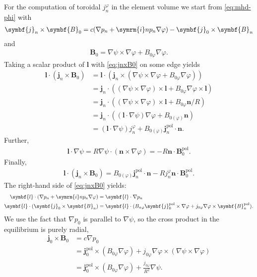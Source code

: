\documentclass[a4paper, 10pt, english]{article}
\let\temp\varrho
\let\varrho\rho
\let\rho\temp
\let\temp\vartheta
\let\vartheta\theta
\let\theta\temp
\let\temp\varphi
\let\varphi\phi
\let\phi\temp
\let\vec\symbf
\newcommand*\im{\ensuremath{\symrm{i}}}  %
\newcommand*\pol{\ensuremath{\textrm{pol}}}  %
\begin{document}
For the computation of toroidal $j_{n}^{\phi}$ in the element volume we start from \cref{eq:mhd-phi} with
\begin{gather}
  \vec{j}_{n} \times \vec{B}_{0} = c (\nabla p_{n} + \im n p_{n} \nabla \phi) - \vec{j}_{0} \times \vec{B}_{n} \label{eq:jnxB0}
\end{gather}
and
\begin{gather}
  \vec{B}_{0} = \nabla \psi \times \nabla \phi + B_{0 \phi} \nabla \phi.
\end{gather}
Taking a scalar product of $\vec{l}$ with \cref{eq:jnxB0} on some edge yields
\begin{align}
  \vec{l} \cdot (\vec{j}_{n} \times \vec{B}_{0}) &= \vec{l} \cdot (\vec{j}_{n} \times (\nabla \psi \times \nabla \phi + B_{0 \phi} \nabla \phi)) \nonumber \\
  &= \vec{j}_{n} \cdot ((\nabla \psi \times \nabla \phi) \times \vec{l} + B_{0 \phi} \nabla \phi \times \vec{l}) \nonumber \\
  &= \vec{j}_{n} \cdot ((\nabla \psi \times \nabla \phi) \times \vec{l} + B_{0 \phi} \vec{n} / R) \nonumber \\
  &= \vec{j}_{n} \cdot \left( (\vec{l} \cdot \nabla \psi) \nabla \phi + B_{0 (\phi)} \vec{n} \right) \nonumber \\
  &= (\vec{l} \cdot \nabla \psi) j_{n}^{\phi} + B_{0 (\phi)} \vec{j}_{n}^{\pol} \cdot \vec{n}.
\end{align}
Further,
\begin{gather}
  \vec{l} \cdot \nabla \psi = R \nabla \psi \cdot \left( \vec{n} \times \nabla \phi \right) = -R \vec{n} \cdot \vec{B}_{0}^{\pol}.
\end{gather}
Finally,
\begin{gather}
  \vec{l} \cdot (\vec{j}_{n} \times \vec{B}_{0}) = B_{0 (\phi)} \vec{j}_{n}^{\pol} \cdot \vec{n} - R j_{n}^{\phi} \vec{n} \cdot \vec{B}_{0}^{\pol}.
\end{gather}
The right-hand side of \cref{eq:jnxB0} yields:
\begin{align}
  \vec{l} \cdot (\nabla p_{n} + \im n p_{n} \nabla \phi) &= \vec{l} \cdot \nabla p_{n} \\
  \vec{l} \cdot (\vec{j}_{0} \times \vec{B}_{n}) &= \vec{l} \cdot (B_{n \phi} \vec{j}_{0}^{\pol} \times \nabla \phi + j_{0 \phi} \nabla \phi \times \vec{B}_{n}^{\pol}).
\end{align}
We use the fact that $\nabla p_{0}$ is parallel to $\nabla \psi$, so the cross product in the equilibrium is purely radial,
\begin{align}
  \vec{j}_{0} \times \vec{B}_{0} &= c \nabla p_{0} \nonumber \\
  &= \vec{j}_{0}^{\pol} \times (B_{0 \phi} \nabla \phi) + j_{0 \phi} \nabla \phi \times (\nabla \psi \times \nabla \phi) \nonumber \\
  &= \vec{j}_{0}^{\pol} \times (B_{0 \phi} \nabla \phi) + \frac{j_{0 \phi}}{R^{2}} \nabla \psi.
\end{align}
\end{document}
